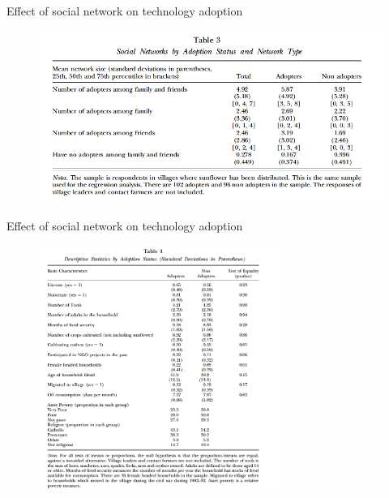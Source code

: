\documentclass{beamer}
\begin{document}
\begin{frame}{Effect of social network on technology adoption}{}
\begin{figure}[h]
\begin{centering}
  \includegraphics[width=\textwidth]{01table3}
   \label{fig:01table3}
\end{centering}
\end{figure}
\end{frame}

\begin{frame}{Effect of social network on technology adoption}{}
\begin{figure}[h]
\begin{centering}
  \includegraphics[width=0.7\textwidth]{01table4}
   \label{fig:01table4}
\end{centering}
\end{figure}
\end{frame}
\end{document}
